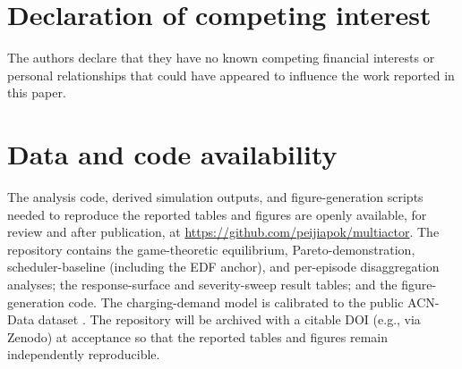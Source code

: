 \documentclass[12pt]{article}
\begin{document}
\section*{Declaration of competing interest}
The authors declare that they have no known competing financial interests or personal relationships that could have appeared to influence the work reported in this paper.

\section*{Data and code availability}
The analysis code, derived simulation outputs, and figure-generation scripts needed to reproduce the reported tables and figures are openly available, for review and after publication, at \url{https://github.com/peijiapok/multiactor}. The repository contains the game-theoretic equilibrium, Pareto-demonstration, scheduler-baseline (including the EDF anchor), and per-episode disaggregation analyses; the response-surface and severity-sweep result tables; and the figure-generation code. The charging-demand model is calibrated to the public ACN-Data dataset \cite{acndata2019}. The repository will be archived with a citable DOI (e.g., via Zenodo) at acceptance so that the reported tables and figures remain independently reproducible.
\end{document}
